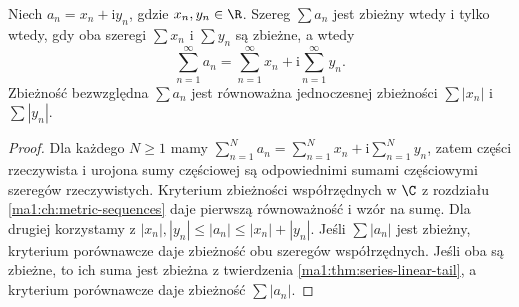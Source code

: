 \begin{stwierdzenie}
\label{ma1:prop:complex-series-components}
Niech $a_n=x_n+\mathrm i y_n$, gdzie $x_n,y_n\in\R$. Szereg $\sum a_n$ jest zbieżny wtedy i tylko wtedy, gdy oba szeregi $\sum x_n$ i $\sum y_n$ są zbieżne, a wtedy
\[
 \sum_{n=1}^\infty a_n=\sum_{n=1}^\infty x_n+
 \mathrm i\sum_{n=1}^\infty y_n.
\]
Zbieżność bezwzględna $\sum a_n$ jest równoważna jednoczesnej zbieżności $\sum|x_n|$ i $\sum|y_n|$.
\end{stwierdzenie}
\begin{proof}
Dla każdego $N\ge1$ mamy $\sum_{n=1}^N a_n=\sum_{n=1}^N x_n+\mathrm i\sum_{n=1}^N y_n$, zatem części rzeczywista i urojona sumy częściowej są odpowiednimi sumami częściowymi szeregów rzeczywistych. Kryterium zbieżności współrzędnych w $\C$ z rozdziału \ref{ma1:ch:metric-sequences} daje pierwszą równoważność i wzór na sumę. Dla drugiej korzystamy z $|x_n|,|y_n|\le|a_n|\le|x_n|+|y_n|$. Jeśli $\sum|a_n|$ jest zbieżny, kryterium porównawcze daje zbieżność obu szeregów współrzędnych. Jeśli oba są zbieżne, to ich suma jest zbieżna z twierdzenia \ref{ma1:thm:series-linear-tail}, a kryterium porównawcze daje zbieżność $\sum|a_n|$.
\end{proof}

